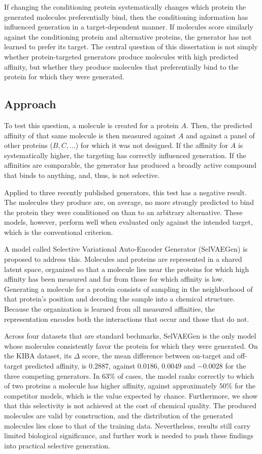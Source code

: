 \documentclass[a4paper,12pt]{article}
\begin{document}
If changing the conditioning protein systematically changes which protein the generated molecules preferentially bind, then the conditioning information has influenced generation in a target-dependent manner. If molecules score similarly against the conditioning protein and alternative proteins, the generator has not learned to prefer its target. The central question of this dissertation is not simply whether protein-targeted generators produce molecules with high predicted affinity, but whether they produce molecules that preferentially bind to the protein for which they were generated.

\subsection{Approach}
To test this question, a molecule is created for a protein $A$. Then, the predicted affinity of that
same molecule is then measured against $A$ and against a panel of other proteins ($B, C, \dots$) for which
it was not designed. If the affinity for $A$ is systematically higher, the
targeting has correctly influenced generation. If the affinities are comparable, the
generator has produced a broadly active compound that binds to anything, and, thus, is not selective.

Applied to three recently published generators, this test has a negative result.
The molecules they produce are, on average, no more strongly predicted to bind the
protein they were conditioned on than to an arbitrary alternative. These models, however,
perform well when evaluated only against the intended target, which is the
conventional criterion.

A model called Selective Variational Auto-Encoder Generator (SelVAEGen) is proposed to address this. Molecules and proteins are represented in a
shared latent space, organized so that a molecule lies near the proteins for which
high affinity has been measured and far from those for which affinity is low.
Generating a molecule for a protein consists of sampling in the neighborhood of that
protein's position and decoding the sample into a chemical structure. Because the
organization is learned from all measured affinities, the representation encodes both the
interactions that occur and those that do not.

Across four datasets that are standard bechmarks, SelVAEGen is the only model whose molecules consistently favor
the protein for which they were generated. On the KIBA dataset, its $\Delta$ score, the mean
difference between on-target and off-target predicted affinity, is $0.2887$, against
$0.0186$, $0.0049$ and $-0.0028$ for the three competing generators. In $63\%$ of cases,
the model ranks correctly to which of two proteins a molecule has higher affinity, against
approximately $50\%$ for the competitor models, which is the value expected by chance.  Furthermore, we show that this selectivity is not achieved at the cost of chemical quality. The produced molecules are valid
by construction, and the distribution of the generated molecules lies close to that of the training data.
Nevertheless, results still carry limited biological significance, and further work is needed to push these findings into practical selective generation.
\end{document}

